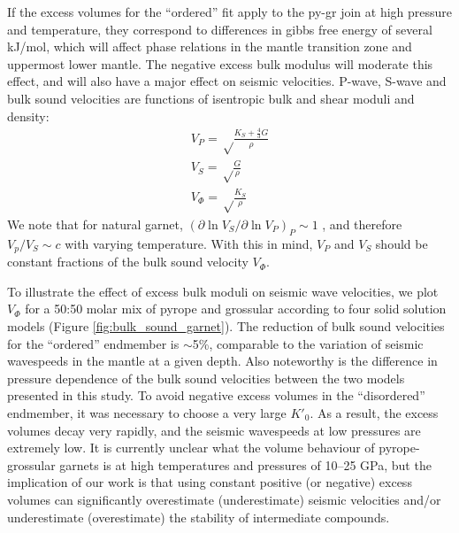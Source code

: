 \documentclass[review]{elsarticle}
\begin{document}
If the excess volumes for the ``ordered'' fit apply to the py-gr join at high pressure and temperature, they correspond to differences in gibbs free energy of several kJ/mol, which will affect phase relations in the mantle transition zone and uppermost lower mantle. The negative excess bulk modulus will moderate this effect, and will also have a major effect on seismic velocities. P-wave, S-wave and bulk sound velocities are functions of isentropic bulk and shear moduli and density:
\begin{eqnarray}
V_P = \sqrt \frac{K_S + \frac{4}{3} G }{\rho} \\
V_S = \sqrt \frac{G}{\rho} \\
V_\Phi = \sqrt \frac{K_S}{\rho}
\end{eqnarray}
We note that for natural garnet, $(\partial \ln V_S / \partial \ln V_P)_P \sim 1$ \citep{CBS1997}, and therefore $V_p/V_S \sim c$ with varying temperature. With this in mind, $V_P$ and $V_S$ should be constant fractions of the bulk sound velocity $V_\Phi$.

To illustrate the effect of excess bulk moduli on seismic wave velocities, we plot $V_\Phi$ for a 50:50 molar mix of pyrope and grossular according to four solid solution models (Figure \ref{fig:bulk_sound_garnet}). The reduction of bulk sound velocities for the ``ordered'' endmember is $\sim$5\%, comparable to the variation of seismic wavespeeds in the mantle at a given depth. Also noteworthy is the difference in pressure dependence of the bulk sound velocities between the two models presented in this study. To avoid negative excess volumes in the ``disordered'' endmember, it was necessary to choose a very large $K'_0$. As a result, the excess volumes decay very rapidly, and the seismic wavespeeds at low pressures are extremely low. It is currently unclear what the volume behaviour of pyrope-grossular garnets is at high temperatures and pressures of 10--25 GPa, but the implication of our work is that using constant positive (or negative) excess volumes can significantly overestimate (underestimate) seismic velocities and/or underestimate (overestimate) the stability of intermediate compounds.
\end{document}
